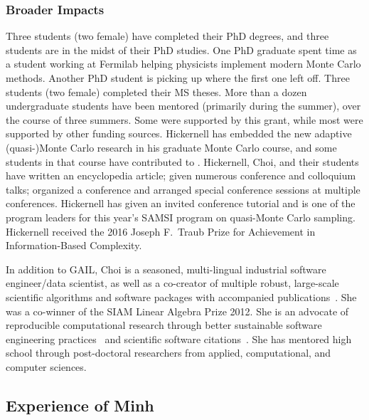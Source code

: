 \documentclass[11pt]{NSFamsart}
\begin{document}
\subsubsection{Broader Impacts}  Three students (two female) have completed their PhD degrees, and three students are in the midst of their PhD studies.  One PhD graduate spent time as a student working at Fermilab helping physicists implement modern Monte Carlo methods.  Another PhD student is picking up where the first one left off.  Three students (two female) completed their MS theses. More than a dozen undergraduate students have been mentored (primarily during the summer),  over the course of three summers.  Some were supported by this grant, while most were supported by other funding sources.  Hickernell has embedded the new adaptive (quasi-)Monte Carlo research in his graduate Monte Carlo course, and some students in that course have contributed to \GAIL.  Hickernell, Choi, and their students have written an encyclopedia article; given numerous conference and colloquium talks; organized a conference and arranged special conference sessions at multiple conferences.  Hickernell has given an invited conference tutorial and is one of the program leaders for this year's SAMSI program on quasi-Monte Carlo sampling. Hickernell received the 2016 Joseph F.\ Traub Prize for Achievement in Information-Based Complexity.

In addition to GAIL, Choi is a seasoned, multi-lingual industrial software engineer/data scientist, as well as a co-creator of multiple robust, large-scale scientific algorithms and software packages with accompanied publications~\cite{CLM17,C14b,C14a,CS14,CPS11,DFHL03}. She was a co-winner of the SIAM Linear Algebra Prize 2012. She is an advocate of reproducible computational research through better sustainable software engineering practices~\cite{KCNN16,KCWH16,KCLM14,C14a} and scientific software citations~\cite{SKNF11}. She has mentored high school through post-doctoral researchers from applied, computational, and computer sciences. 

\subsection{Experience of Minh}
\end{document}
